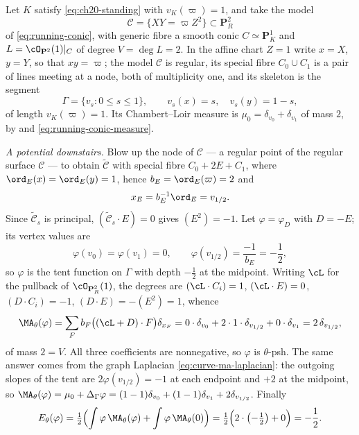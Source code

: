 \begin{example}
\label{ex:ch30-conic-base-change}
Let \(K\) satisfy \eqref{eq:ch20-standing} with \(v_K(\varpi)=1\), and take
the model
\[
 \mathcal C=\{XY=\varpi Z^2\}\subset\mathbf P^2_R
\]
of \eqref{eq:running-conic}, with generic fibre a smooth conic
\(C\simeq\mathbf P^1_K\) and \(L=\cO_{\mathbf P^2}(1)|_C\) of degree
\(V=\deg L=2\).  In the affine chart \(Z=1\) write \(x=X\), \(y=Y\), so
that \(xy=\varpi\); the model \(\mathcal C\) is regular, its special fibre
\(C_0\cup C_1\) is a pair of lines meeting at a node, both of multiplicity
one, and its skeleton is the segment
\[
 \Gamma=\{v_s:0\leq s\leq1\},
 \qquad v_s(x)=s,\quad v_s(y)=1-s,
\]
of length \(v_K(\varpi)=1\).  Its Chambert--Loir measure is
\(\mu_0=\delta_{v_0}+\delta_{v_1}\) of mass \(2\), by
 and \eqref{eq:running-conic-measure}.

\emph{A potential downstairs.}  Blow up the node of \(\mathcal C\) --- a regular
point of the regular surface \(\mathcal C\) --- to obtain \(\widetilde{\mathcal C}\) with
special fibre \(C_0+2E+C_1\), where \(\ord_E(x)=\ord_E(y)=1\), hence
\(b_E=\ord_E(\varpi)=2\) and
\[
 x_E=b_E^{-1}\ord_E=v_{1/2}.
\]
Since \(\widetilde{\mathcal C}_s\) is principal, \((\widetilde{\mathcal C}_s\cdot E)=0\)
gives \((E^2)=-1\).  Let \(\varphi=\varphi_D\) with \(D=-E\); its vertex
values are
\[
 \varphi(v_0)=\varphi(v_1)=0,\qquad
 \varphi(v_{1/2})=\frac{-1}{b_E}=-\frac12,
\]
so \(\varphi\) is the tent function on \(\Gamma\) with depth \(-\tfrac12\)
at the midpoint.  Writing \(\cL\) for the pullback of
\(\cO_{\mathbf P^2_R}(1)\), the degrees are \((\cL\cdot C_i)=1\),
\((\cL\cdot E)=0\), \((D\cdot C_i)=-1\), \((D\cdot E)=-(E^2)=1\), whence
\begin{equation}
\label{eq:ch30-conic-ma-down}
 \MA_\theta(\varphi)
 =\sum_Fb_F\bigl((\cL+D)\cdot F\bigr)\delta_{x_F}
 =0\cdot\delta_{v_0}+2\cdot1\cdot\delta_{v_{1/2}}+0\cdot\delta_{v_1}
 =2\,\delta_{v_{1/2}},
\end{equation}
of mass \(2=V\).  All three coefficients are nonnegative, so
\(\varphi\) is \(\theta\)-psh.  The same answer comes from the graph
Laplacian \eqref{eq:curve-ma-laplacian}: the outgoing slopes of the tent
are \(2\varphi(v_{1/2})=-1\) at each endpoint and \(+2\) at the midpoint,
so \(\MA_\theta(\varphi)=\mu_0+\Delta_\Gamma\varphi
=(1-1)\delta_{v_0}+(1-1)\delta_{v_1}+2\delta_{v_{1/2}}\).  Finally
\begin{equation}
\label{eq:ch30-conic-energy-down}
 E_\theta(\varphi)
 =\tfrac12\Bigl(\int\varphi\,\MA_\theta(\varphi)
   +\int\varphi\,\MA_\theta(0)\Bigr)
 =\tfrac12\Bigl(2\cdot\bigl(-\tfrac12\bigr)+0\Bigr)=-\frac12 .
\end{equation}


\end{example}
